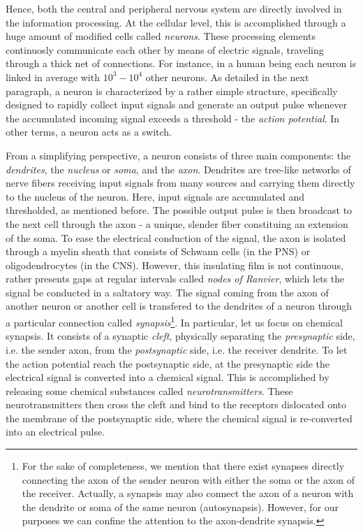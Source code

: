 \documentclass[11pt, a4paper, twoside, openright]{report}
\theoremstyle{theorem}
\numberwithin{equation}{section}
\numberwithin{figure}{section}
\begin{document}
		Hence, both the central and peripheral nervous system are directly involved in the information processing. At the cellular level, this is accomplished through a huge amount of modified cells called \emph{neurons}. These processing elements continuosly communicate each other by means of electric signals, traveling through a thick net of connections. For instance, in a human being each neuron is linked in average with $10^3 - 10^4$ other neurons. As detailed in the next paragraph, a neuron is characterized by a rather simple structure, specifically designed to rapidly collect input signals and generate an output pulse whenever the accumulated incoming signal exceeds a threshold - the \emph{action potential}. In other terms, a neuron acts as a switch.
		
		From a simplifying perspective, a neuron consists of three main components: the \emph{dendrites}, the \emph{nucleus} or \emph{soma}, and the \emph{axon}. Dendrites are tree-like networks of nerve fibers receiving input signals from many sources and carrying them directly to the nucleus of the neuron. Here, input signals are accumulated and thresholded, as mentioned before. The possible output pulse is then broadcast to the next cell through the axon - a unique, slender fiber constituing an extension of the soma. To ease the electrical conduction of the signal, the axon is isolated through a myelin sheath that consists of Schwann cells (in the PNS) or oligodendrocytes (in the CNS). However, this insulating film is not continuous, rather presents gaps at regular intervals called \emph{nodes of Ranvier}, which lets the signal be conducted in a saltatory way.
		The signal coming from the axon of another neuron or another cell is transfered to the dendrites of a neuron through a particular connection called \emph{synapsis}\footnote{For the sake of completeness, we mention that there exist synapses directly connecting the axon of the sender neuron with either the soma or the axon of the receiver. Actually, a synapsis may also connect the axon of a neuron with the dendrite or soma of the same neuron (autosynapsis). However, for our purposes we can confine the attention to the axon-dendrite synapsis.}. In particular, let us focus on chemical synapsis. It consists of a synaptic \emph{cleft}, physically separating the \emph{presynaptic} side, i.e. the sender axon, from the \emph{postsynaptic} side, i.e. the receiver dendrite. To let the action potential reach the postsynaptic side, at the presynaptic side the electrical signal is converted into a chemical signal. This is accomplished by releasing some chemical substances called \emph{neurotransmitters}. These neurotransmitters then cross the cleft and bind to the receptors dislocated onto the membrane of the postsynaptic side, where the chemical signal is re-converted into an electrical pulse. 
		
\end{document}

